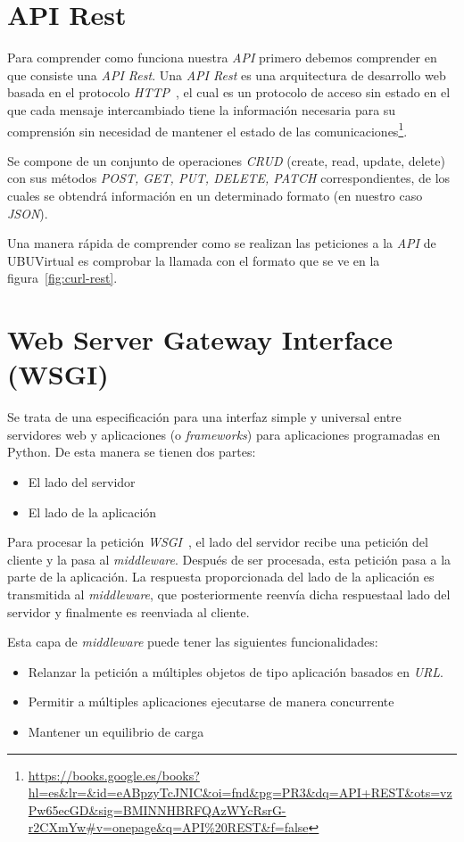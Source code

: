 
\section{API Rest}\label{sec:api-rest}
Para comprender como funciona nuestra \textit{API} primero debemos comprender en que consiste una \textit{API Rest}. Una \textit{API Rest} es una arquitectura de desarrollo web basada en el protocolo \textit{HTTP}~\cite{wiki:http}, el cual es un protocolo de acceso sin estado en el que cada mensaje intercambiado tiene la información necesaria para su comprensión sin necesidad de mantener el estado de las comunicaciones\footnote{\url{https://books.google.es/books?hl=es\&lr=\&id=eABpzyTcJNIC\&oi=fnd\&pg=PR3\&dq=API+REST\&ots=vzPw65ecGD\&sig=BMINNHBRFQAzWYcRsrG-r2CXmYw\#v=onepage\&q=API\%20REST\&f=false}}.

Se compone de un conjunto de operaciones \textit{CRUD} (create, read, update, delete) con sus métodos \textit{POST, GET, PUT, DELETE, PATCH} correspondientes, de los cuales se obtendrá información en un determinado formato (en nuestro caso \textit{JSON}).

Una manera rápida de comprender como se realizan las peticiones a la \textit{API} de UBUVirtual es comprobar la llamada con el formato que se ve en la figura~\ref{fig:curl-rest}.

\section{Web Server Gateway Interface (WSGI)}\label{sec:wsgi}
Se trata de una especificación para una interfaz simple y universal entre servidores web y aplicaciones (o \textit{frameworks}) para aplicaciones programadas en Python.
De esta manera se tienen dos partes:
\begin{itemize}
	\item El lado del servidor
	\item El lado de la aplicación
\end{itemize}
Para procesar la petición \textit{WSGI}~\cite{wiki:wsgi}, el lado del servidor recibe una petición del cliente y la pasa al \textit{middleware}. Después de ser procesada, esta petición pasa a la parte de la aplicación. La respuesta proporcionada del lado de la aplicación es transmitida al \textit{middleware}, que posteriormente reenvía dicha respuestaal lado del servidor y finalmente es reenviada al cliente.

Esta capa de \textit{middleware} puede tener las siguientes funcionalidades:
\begin{itemize}
	\item Relanzar la petición a múltiples objetos de tipo aplicación basados en \textit{URL}.
	\item Permitir a múltiples aplicaciones ejecutarse de manera concurrente
	\item Mantener un equilibrio de carga
\end{itemize}